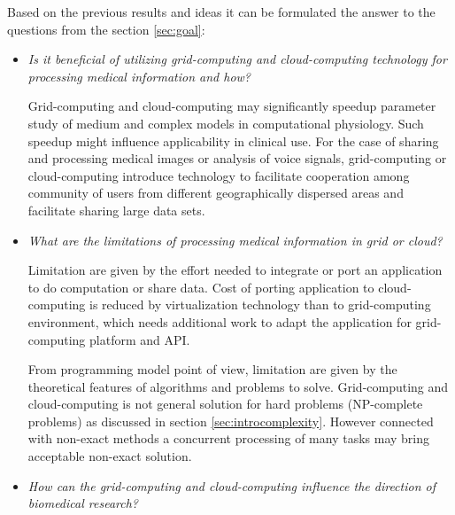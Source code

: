 Based on the previous results and ideas it can be formulated the answer to the questions from the section \ref{sec:goal}:
\begin{itemize} 
\item \emph{Is it beneficial of utilizing grid-computing and cloud-computing technology for processing medical information and how?}

Grid-computing and cloud-computing may significantly speedup parameter study of medium and complex models in computational physiology. Such speedup might influence applicability in clinical use. %
For the case of sharing and processing medical images or analysis of voice signals, grid-computing or cloud-computing introduce technology to facilitate cooperation among community of users from different geographically dispersed areas and facilitate sharing large data sets.

\item \emph{What are the limitations of processing medical information in grid or cloud?}

Limitation are given by the effort needed to integrate or port an application to do computation or share data. Cost of porting application to cloud-computing is reduced by virtualization technology than to grid-computing environment, which needs additional work to adapt the application for grid-computing platform and API. 

From programming model point of view, limitation are given by the theoretical features of algorithms and problems to solve. Grid-computing and cloud-computing is not general solution for hard problems (NP-complete problems) as discussed in section \ref{sec:introcomplexity}. However connected with non-exact methods a concurrent processing of many tasks may bring acceptable non-exact solution.

\item \emph{How can the grid-computing and cloud-computing influence the direction of biomedical research?}

 


\end{itemize}
